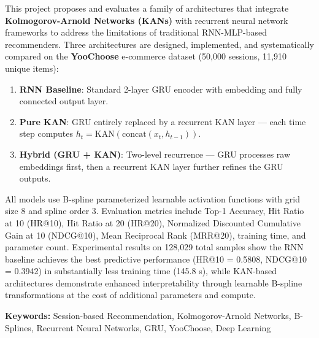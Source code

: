\documentclass[12pt,a4paper]{report}
\begin{document}
This project proposes and evaluates a family of architectures that integrate
\textbf{Kolmogorov-Arnold Networks (KANs)} with recurrent neural network
frameworks to address the limitations of traditional RNN-MLP-based recommenders.
Three architectures are designed, implemented, and systematically compared on the
\textbf{YooChoose} e-commerce dataset (50,000 sessions, 11,910 unique items):

\begin{enumerate}
    \item \textbf{RNN Baseline}: Standard 2-layer GRU encoder with embedding and
          fully connected output layer.
    \item \textbf{Pure KAN}: GRU entirely replaced by a recurrent KAN layer ---
          each time step computes $h_t = \text{KAN}(\text{concat}(x_t, h_{t-1}))$.
    \item \textbf{Hybrid (GRU + KAN)}: Two-level recurrence --- GRU processes raw
          embeddings first, then a recurrent KAN layer further refines the GRU outputs.
\end{enumerate}

All models use B-spline parameterized learnable activation functions with grid
size 8 and spline order 3. Evaluation metrics include Top-1 Accuracy, Hit Ratio
at 10 (HR@10), Hit Ratio at 20 (HR@20), Normalized Discounted Cumulative Gain
at 10 (NDCG@10), Mean Reciprocal Rank (MRR@20), training time, and parameter
count. Experimental results on 128,029 total samples show the RNN baseline
achieves the best predictive performance (HR@10 = 0.5808, NDCG@10 = 0.3942) in
substantially less training time (145.8 s), while KAN-based architectures
demonstrate enhanced interpretability through learnable B-spline transformations
at the cost of additional parameters and compute.

\vspace{0.3cm}
\noindent\textbf{Keywords:} Session-based Recommendation, Kolmogorov-Arnold Networks,
B-Splines, Recurrent Neural Networks, GRU, YooChoose, Deep Learning

\tableofcontents
\listoffigures
\listoftables


\end{document}
